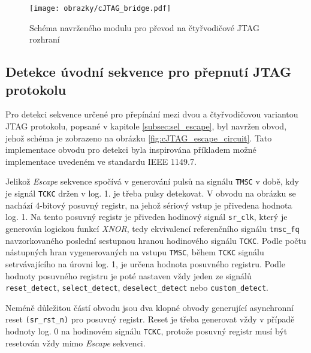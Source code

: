 \begin{figure}[!h]
  \begin{center}
    \texttt{[image: obrazky/cJTAG\_bridge.pdf]}
  \end{center}
  \caption{Schéma navrženého modulu pro převod na čtyřvodičové \acs{JTAG} rozhraní}
	\label{fig:cJTAG_bridge}
\end{figure}

\subsection{Detekce úvodní sekvence pro přepnutí \acs{JTAG} protokolu}	\label{subsec:sel_escape_det}
Pro detekci sekvence určené pro přepínání mezi dvou a čtyřvodičovou variantou \acs{JTAG} protokolu, popsané v kapitole \ref{subsec:sel_escape}, byl navržen obvod, jehož schéma je zobrazeno na obrázku \ref{fig:cJTAG_escape_circuit}. Tato implementace obvodu pro detekci byla inspirována příkladem možné implementace uvedeném ve standardu IEEE 1149.7.

Jelikož \textit{Escape} sekvence spočívá v generování pulsů na signálu \texttt{\acs{TMSC}} v době, kdy je signál \texttt{\acs{TCKC}} držen v log. 1. je třeba pulsy detekovat. V obvodu na obrázku se nachází 4-bitový posuvný registr, na jehož sériový vstup je přivedena hodnota log. 1. Na tento posuvný registr je přiveden hodinový signál \texttt{sr\_clk}, který je generován logickou funkcí \textit{XNOR}, tedy ekvivalencí referenčního signálu \texttt{tmsc\_fq} navzorkovaného poslední sestupnou hranou hodinového signálu \texttt{\acs{TCKC}}. Podle počtu nástupných hran vygenerovaných na vstupu {\texttt{\acs{TMSC}}}, během {\texttt{\acs{TCKC}}} signálu setrvávajícího na úrovni log. 1, je určena hodnota posuvného registru. Podle hodnoty posuvného registru je poté nastaven vždy jeden ze signálů \texttt{reset\_detect}, \texttt{select\_detect}, \texttt{deselect\_detect} nebo \texttt{custom\_detect}. %

Neméně důležitou částí obvodu jsou dva klopné obvody generující asynchronní reset \texttt{(sr\_rst\_n)} pro posuvný registr. Reset je třeba generovat vždy v případě hodnoty log. 0 na hodinovém signálu {\texttt{\acs{TCKC}}}, protože posuvný registr musí být resetován vždy mimo \textit{Escape} sekvenci. %

